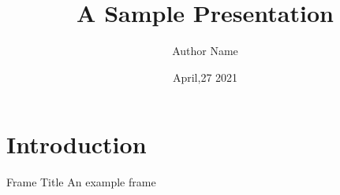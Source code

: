 \documentclass{viper-slide}
\title{A Sample Presentation}
\author{Author Name}
\institute{Institute Name}
\date{April,27 2021}
\begin{document}
\maketitle

\section{Introduction}

\begin{frame}{Frame Title}
    An example frame
\end{frame}
\end{document}
